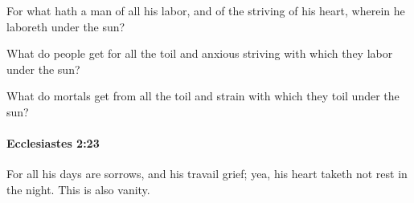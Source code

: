 			\begin{versebox}
					\item[BHS] 
					\item[LXX] 
					\item[ASV] For what hath a man of all his labor, and of the striving of his heart, wherein he laboreth under the sun?
					\item[NIV] What do people get for all the toil and anxious striving with which they labor under the sun?
					\item[NRSV] What do mortals get from all the toil and strain with which they toil under the sun?
			\end{versebox}

		\paragraph{Ecclesiastes 2:23} %
			\label{ECCLESIASTES-2-23}

			For all his days are sorrows, and his travail grief; yea, his heart taketh not rest in the night. This is also vanity.

